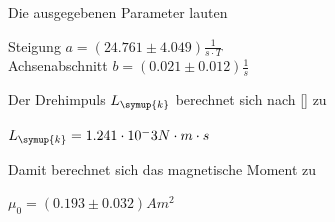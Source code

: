Die ausgegebenen Parameter lauten\\
\begin{centering}
Steigung $a = (24.761 ± 4.049) \frac{1}{s \cdot T}$\\
Achsenabschnitt $b =(0.021 ± 0.012) \frac{1}{s}$\\
\end{centering}

Der Drehimpuls $L_{\symup{k}}$ berechnet sich nach \ref{} zu\\

\begin{centering}
  $L_{\symup{k}} = 1.241 \cdot 10^-3 N\cdot m\cdot s$
\end{centering}

Damit berechnet sich das magnetische Moment zu\\

\begin{centering}
  $\mu_0 = (0.193 \pm 0.032) Am^2$
\end{centering}
 


